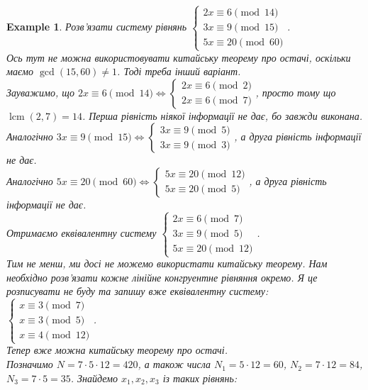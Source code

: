 \documentclass[a4paper, 14pt]{extarticle}
\theoremstyle{theoremdd}
\theoremstyle{theoremdd}
\theoremstyle{theoremdd}
\theoremstyle{theoremdd}
\newtheorem{example}[theorem]{Example}
\theoremstyle{theoremdd}
\theoremstyle{theoremdd}
\theoremstyle{theoremdd}
\theoremstyle{theoremdd}
\DeclareMathOperator{\lcm}{lcm}
\begin{document}
\begin{example}
Розв'язати систему рівнянь $\begin{cases} 2x \equiv 6 \pmod {14} \\ 3x \equiv 9 \pmod {15} \\ 5x \equiv 20 \pmod {60} \end{cases}$.\\
Ось тут не можна використовувати китайську теорему про остачі, оскільки маємо $\gcd(15,60) \neq 1$. Тоді треба інший варіант.\\
Зауважимо, що $2x \equiv 6 \pmod {14} \iff \begin{cases} 2x \equiv 6 \pmod 2 \\ 2x \equiv 6 \pmod 7 \end{cases}$, просто тому що $\lcm(2,7) = 14$. Перша рівність ніякої інформації не дає, бо завжди виконана.\\
Аналогічно $3x \equiv 9 \pmod {15} \iff \begin{cases} 3x \equiv 9 \pmod 5 \\ 3x \equiv 9 \pmod 3 \end{cases}$, а друга рівність інформації не дає.\\
Аналогічно $5x \equiv 20 \pmod {60} \iff \begin{cases} 5x \equiv 20 \pmod {12} \\ 5x \equiv 20 \pmod 5 \end{cases}$, а друга рівність інформації не дає.\\
Отримаємо еквівалентну систему $\begin{cases}
2x \equiv 6 \pmod 7 \\
3x \equiv 9 \pmod 5 \\
5x \equiv 20 \pmod {12}
\end{cases}$.\\
Тим не менш, ми досі не можемо використати китайську теорему. Нам необхідно розв'язати кожне лінійне конгруентне рівняння окремо. Я це розписувати не буду та запишу вже еквівалентну систему:\\
$\begin{cases}
x \equiv 3 \pmod 7 \\
x \equiv 3 \pmod 5 \\
x \equiv 4 \pmod {12}
\end{cases}$.\\
Тепер вже можна китайську теорему про остачі. \\
Позначимо $N = 7 \cdot 5 \cdot 12 = 420$, а також числа $N_1 = 5 \cdot 12 = 60$, $N_2 = 7 \cdot 12 = 84$, $N_3 = 7 \cdot 5 = 35$. Знайдемо $x_1,x_2,x_3$ із таких рівнянь:\\

\end{example}
\end{document}
